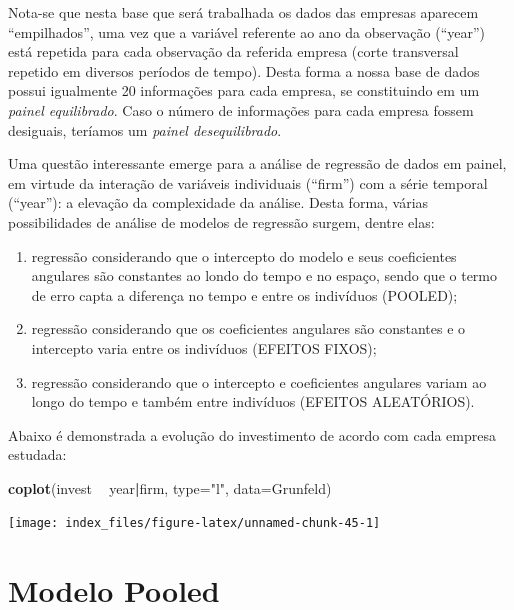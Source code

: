 \documentclass[12pt,brazil,oneside]{book}
\newenvironment{Shaded}{\begin{snugshade}}{\end{snugshade}}
\newcommand{\DataTypeTok}[1]{\textcolor[rgb]{0.13,0.29,0.53}{#1}}
\newcommand{\KeywordTok}[1]{\textcolor[rgb]{0.13,0.29,0.53}{\textbf{#1}}}
\newcommand{\NormalTok}[1]{#1}
\newcommand{\OperatorTok}[1]{\textcolor[rgb]{0.81,0.36,0.00}{\textbf{#1}}}
\newcommand{\StringTok}[1]{\textcolor[rgb]{0.31,0.60,0.02}{#1}}
\begin{document}
Nota-se que nesta base que será trabalhada os dados das empresas
aparecem ``empilhados'', uma vez que a variável referente ao ano da
observação (``year'') está repetida para cada observação da referida
empresa (corte transversal repetido em diversos períodos de tempo).
Desta forma a nossa base de dados possui igualmente 20 informações para
cada empresa, se constituindo em um \emph{painel equilibrado}. Caso o
número de informações para cada empresa fossem desiguais, teríamos um
\emph{painel desequilibrado}.

Uma questão interessante emerge para a análise de regressão de dados em
painel, em virtude da interação de variáveis individuais (``firm'') com
a série temporal (``year''): a elevação da complexidade da análise.
Desta forma, várias possibilidades de análise de modelos de regressão
surgem, dentre elas:

\begin{enumerate}
\def\labelenumi{\alph{enumi})}
\item
  regressão considerando que o intercepto do modelo e seus coeficientes
  angulares são constantes ao londo do tempo e no espaço, sendo que o
  termo de erro capta a diferença no tempo e entre os indivíduos
  (POOLED);
\item
  regressão considerando que os coeficientes angulares são constantes e
  o intercepto varia entre os indivíduos (EFEITOS FIXOS);
\item
  regressão considerando que o intercepto e coeficientes angulares
  variam ao longo do tempo e também entre indivíduos (EFEITOS
  ALEATÓRIOS).
\end{enumerate}

Abaixo é demonstrada a evolução do investimento de acordo com cada
empresa estudada:

\begin{Shaded}
\begin{Highlighting}[]
\KeywordTok{coplot}\NormalTok{(invest }\OperatorTok{~}\StringTok{ }\NormalTok{year}\OperatorTok{|}\NormalTok{firm, }\DataTypeTok{type=}\StringTok{"l"}\NormalTok{, }\DataTypeTok{data=}\NormalTok{Grunfeld)}
\end{Highlighting}
\end{Shaded}

\begin{center}\texttt{[image: index\_files/figure-latex/unnamed-chunk-45-1]} \end{center}

\hypertarget{modelo-pooled}{%
\section{Modelo Pooled}\label{modelo-pooled}}
\end{document}
